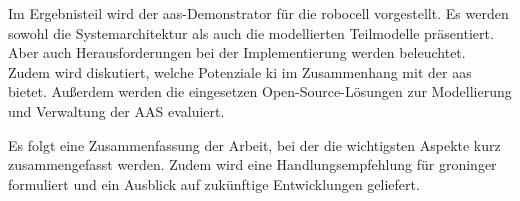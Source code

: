 Im Ergebnisteil wird der \acs{aas}-Demonstrator für die robocell vorgestellt. Es werden sowohl die Systemarchitektur als auch die modellierten Teilmodelle präsentiert.
Aber auch Herausforderungen bei der Implementierung werden beleuchtet.
Zudem wird diskutiert, welche Potenziale \ac{ki} im Zusammenhang mit der \acs{aas} bietet.
Außerdem werden die eingesetzen Open-Source-Lösungen zur Modellierung und Verwaltung der AAS evaluiert.

Es folgt eine Zusammenfassung der Arbeit, bei der die wichtigsten Aspekte kurz zusammengefasst werden.
Zudem wird eine Handlungsempfehlung für groninger formuliert und ein Ausblick auf zukünftige Entwicklungen geliefert.